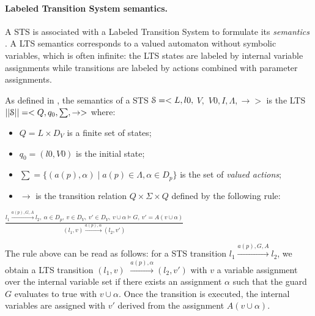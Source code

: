 \paragraph{Labeled Transition System semantics.}
\label{sec:definitions:lts-semantics}

A STS is associated with a Labeled Transition System to formulate
its \emph{semantics} \cite{FTW05}. A LTS semantics corresponds to
a valued automaton without symbolic variables, which is often
infinite: the LTS states are labeled by internal variable
assignments while transitions are labeled by actions combined
with parameter assignments.

\begin{definition}
    As defined in \cite{FTW05}, the semantics of a STS
    $\EuScript{S}=<L,l0,$ $V,$ $V0, I,\Lambda,\rightarrow>$ is
    the LTS $||\EuScript{S}||=<Q,q_0,\sum,\rightarrow>$ where:

	\begin{itemize}

        \item $Q=L \times D_V$ is a finite set of states;

        \item $q_0=(l0,V0)$ is the initial state;

        \item $\sum=\{(a(p),\alpha)  \mid  a(p)\in\Lambda, \alpha
            \in D_p\}$ is the set of \emph{valued actions};

        \item $\rightarrow$ is the transition relation $Q \times
            \Sigma \times Q$ defined by the following rule:\\
	\end{itemize}
    \begin{center}
    {\Large
    $\frac{l_1 \xrightarrow{a(p),G,A}l_2, ~\alpha \in D_p, ~v \in
        D_V, ~v' \in D_V, ~v \cup \alpha \models G, ~v' = A(v
        \cup \alpha)}{(l_1,v) \xrightarrow{a(p),\alpha} (l_2,v') }$
    }
	\end{center}

	\label{def:semantics}
\end{definition}

The rule above can be read as follows: for a STS transition $l_1
\xrightarrow{a(p),G,A}l_2$, we obtain a LTS transition $(l_1,v)$
$\xrightarrow{a(p),\alpha} (l_2,v')$ with $v$ a variable
assignment over the internal variable set if there exists an
assignment $\alpha$ such that the guard $G$ evaluates to true
with $v \cup \alpha$. Once the transition is executed, the
internal variables are assigned with $v'$ derived from the
assignment $A(v \cup \alpha)$.

